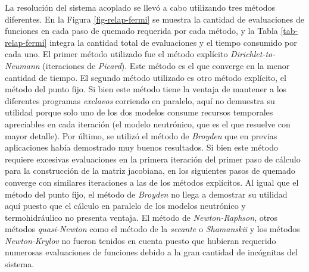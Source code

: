 La resolución del sistema acoplado se llevó a cabo utilizando tres métodos diferentes.
En la Figura \ref{fig-relap-fermi} se muestra la cantidad de evaluaciones de funciones en cada paso de quemado requerida por cada método,
y la Tabla \ref{tab-relap-fermi} integra la cantidad total de evaluaciones y el tiempo consumido por cada uno.
El primer método utilizado fue el método explícito \textit{Dirichlet-to-Neumann} (iteraciones de \textit{Picard}).
Este método es el que converge en la menor cantidad de tiempo.
El segundo método utilizado es otro método explícito, el método del punto fijo.
Si bien este método tiene la ventaja de mantener a los diferentes programas \textit{exclavos} corriendo en paralelo,
aquí no demuestra su utilidad porque solo uno de los dos modelos consume recursos temporales apreciables en cada iteración (el modelo neutrónico, que es el que resuelve con mayor detalle).
Por último, se utilizó el método de \textit{Broyden} que en previas aplicaciones había demostrado muy buenos resultados.
Si bien este método requiere excesivas evaluaciones en la primera iteración del primer paso de cálculo para la construcción de la matriz jacobiana,
en los siguientes pasos de quemado converge con similares iteraciones a las de los métodos explícitos.
Al igual que el método del punto fijo, el método de \textit{Broyden} no llega a demostrar su utilidad aquí
puesto que el cálculo en paralelo de los modelos neutrónico y termohidráulico no presenta ventaja.
El método de \textit{Newton-Raphson}, otros métodos \textit{quasi-Newton} como el método de la \textit{secante} o \textit{Shamanskii} y los métodos \textit{Newton-Krylov}
no fueron tenidos en cuenta puesto que hubieran requerido numerosas evaluaciones de funciones debido a la gran cantidad de incógnitas del sistema.

